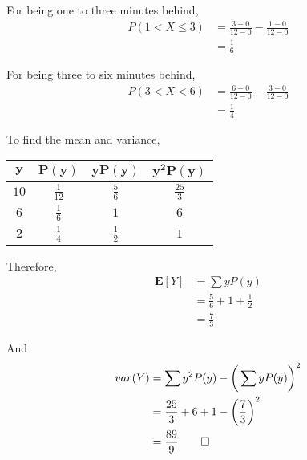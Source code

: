 \documentclass[paper=usletter, fontsize=12pt]{article}
\begin{document}
\begin{enumerate}
\begin{cproof}
            For being one to three minutes behind,
            \begin{align*}
                P(1 < X \le 3) & = \frac{3-0}{12-0}-\frac{1-0}{12-0}\\
                & = \frac{1}{6}
            \end{align*}
            \endgroup

            For being three to six minutes behind,
            \begin{align*}
                P(3 < X < 6) & = \frac{6-0}{12-0}-\frac{3-0}{12-0}\\
                & = \frac{1}{4}
            \end{align*}
            \endgroup

            To find the mean and variance,
                \begin{table}[h]
                    \centering
                    \renewcommand{\arraystretch}{2.5}
                    \begin{tabular}{|c|c|c|c|}
                        \hline
                        $\bm{y}$ & $\bm{P(y)}$ & $\bm{yP(y)}$ & $\bm{y^2P(y)}$ \\
                        \hline
                        $10$ & $\frac{1}{12}$ & $\frac{5}{6}$ & $\frac{25}{3}$ \\
                        \hline
                        $6$ & $\frac{1}{6}$ & $1$ & $6$ \\
                        \hline
                        $2$ & $\frac{1}{4}$ & $\frac{1}{2}$ & $1$ \\
                        \hline
                    \end{tabular}
                \end{table}

            Therefore,
            \begin{align*}
                \textbf{E}[Y] &= \sum yP(y)\\
                & = \frac{5}{6} + 1 + \frac{1}{2}\\
                & = \frac{7}{3}
            \end{align*}
            \endgroup

            And
            \begin{align*}
                var(Y) &= \sum y^2P(y)-\bigg(\sum yP(y)\bigg)^2\\
                & = \frac{25}{3} + 6 + 1 - \bigg(\frac{7}{3}\bigg)^2\\
                & = \frac{89}{9} \qedhere
            \end{align*}
            \endgroup


\end{cproof}
\end{enumerate}
\end{document}
